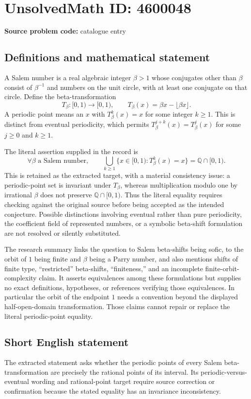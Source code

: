 \documentclass[11pt]{article}
\newcommand{\Q}{\mathbb{Q}}
\begin{document}
\section*{UnsolvedMath ID: 4600048}
\textbf{Source problem code:} catalogue entry
\subsection{Definitions and mathematical statement}
A Salem number is a real algebraic integer $\beta>1$ whose conjugates other than $\beta$ consist of $\beta^{-1}$ and numbers on the unit circle, with at least one conjugate on that circle. Define the beta-transformation
\[
 T_\beta:[0,1)\to[0,1),\qquad
 T_\beta(x)=\beta x-\lfloor\beta x\rfloor.
\]
A periodic point means an $x$ with $T_\beta^k(x)=x$ for some integer $k\ge1$. This is distinct from eventual periodicity, which permits $T_\beta^{j+k}(x)=T_\beta^j(x)$ for some $j\ge0$ and $k\ge1$.

The literal assertion supplied in the record is
\[
 \forall\beta\text{ a Salem number},\qquad
 \bigcup_{k\ge1}\{x\in[0,1):T_\beta^k(x)=x\}
       =\Q\cap[0,1).
\]
This is retained as the extracted target, with a material consistency issue: a periodic-point set is invariant under $T_\beta$, whereas multiplication modulo one by irrational $\beta$ does not preserve $\Q\cap[0,1)$. Thus the literal equality requires checking against the original source before being accepted as the intended conjecture. Possible distinctions involving eventual rather than pure periodicity, the coefficient field of represented numbers, or a symbolic beta-shift formulation are not resolved or silently substituted.

The research summary links the question to Salem beta-shifts being sofic, to the orbit of $1$ being finite and $\beta$ being a Parry number, and also mentions shifts of finite type, ``restricted'' beta-shifts, ``finiteness,'' and an incomplete finite-orbit-complexity claim. It asserts equivalences among these formulations but supplies no exact definitions, hypotheses, or references verifying those equivalences. In particular the orbit of the endpoint $1$ needs a convention beyond the displayed half-open-domain transformation. Those claims cannot repair or replace the literal periodic-point equality.
\subsection{Short English statement}
The extracted statement asks whether the periodic points of every Salem beta-transformation are precisely the rational points of its interval. Its periodic-versus-eventual wording and rational-point target require source correction or confirmation because the stated equality has an invariance inconsistency.
\end{document}
